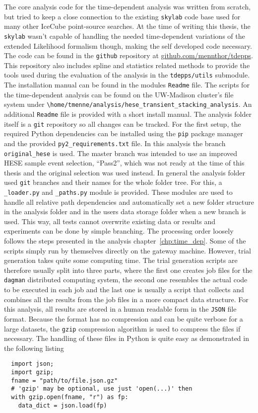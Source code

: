 The core analysis code for the time-dependent analysis was written from scratch, but tried to keep a close connection to the existing \lstinline!skylab! code base used for many other IceCube point-source searches.
At the time of writing this thesis, the \lstinline!skylab! wasn't capable of handling the needed time-dependent variations of the extended Likelihood formalism though, making the self developed code necessary.
The code can be found in the \lstinline!github! repository at \url{github.com/mennthor/tdepps}.
This repository also includes spline and statistics related methods to provide the tools used during the evaluation of the analysis in the \lstinline!tdepps/utils! submodule.
The installation manual can be found in the modules \lstinline!Readme! file.
The scripts for the time-dependent analysis can be found on the UW-Madison cluster's file system under \lstinline!\home/tmenne/analysis/hese_transient_stacking_analysis!.
An additional \lstinline!Readme! file is provided with a short install manual.
The analysis folder itself is a \lstinline!git! repository so all changes can be tracked.
For the first setup, the required Python dependencies can be installed using the \lstinline!pip! package manager and the provided \lstinline!py2_requirements.txt! file.
In this analysis the branch \lstinline!original_hese! is used.
The master branch was intended to use an improved HESE sample event selection, \enquote{Pass2}, which was not ready at the time of this thesis and the original selection was used instead.
In general the analysis folder used \lstinline!git! branches and their names for the whole folder tree.
For this, a \lstinline!_loader.py! and \lstinline!_paths.py! module is provided.
These modules are used to handle all relative path dependencies and automatically set a new folder structure in the analysis folder and in the users data storage folder when a new branch is used.
This way, all tests cannot overwrite existing data or results and experiments can be done by simple branching.
The processing order loosely follows the steps presented in the analysis chapter~\ref{chp:time_dep}.
Some of the scripts simply run by themselves directly on the gateway machine.
However, trial generation takes quite some computing time.
The trial generation scripts are therefore usually split into three parts, where the first one creates job files for the \lstinline!dagman! distributed computing system, the second one resembles the actual code to be executed in each job and the last one is usually a script that collects and combines all the results from the job files in a more compact data structure.
For this analysis, all results are stored in a human readable form in the \lstinline!JSON! file format.
Because the format has no compression and can be quite verbose for a large datasets, the \lstinline!gzip! compression algorithm is used to compress the files if necessary.
The handling of these files in Python is quite easy as demonstrated in the following listing
\begin{lstlisting}
  import json;
  import gzip;
  fname = "path/to/file.json.gz"
  # 'gzip' may be optional, use just 'open(...)' then
  with gzip.open(fname, "r") as fp:
    data_dict = json.load(fp)
\end{lstlisting}

